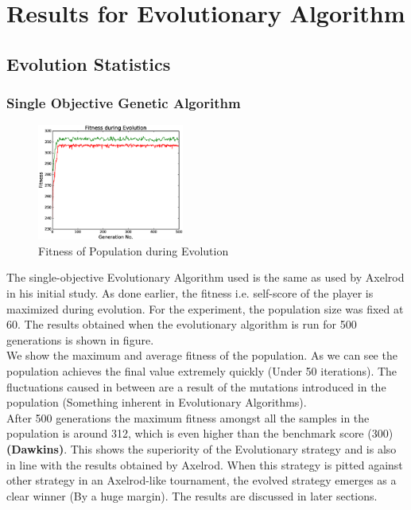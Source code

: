 \documentclass[a4paper]{article}
\begin{document}
	\section{Results for Evolutionary Algorithm}

	\subsection{Evolution Statistics}

	\subsubsection{Single Objective Genetic Algorithm}	

	\begin{figure}
	\centering
	\includegraphics[width=0.43\textwidth]{singFitPlot.eps}
	\caption{\footnotesize{Fitness of Population during Evolution}}
	\end{figure}
	The single-objective Evolutionary Algorithm used is the same as used by Axelrod in his initial study. As done earlier, the fitness i.e. self-score of the player is maximized during evolution. For the experiment, the population size was fixed at 60. The results obtained when the evolutionary algorithm is run for 500 generations is shown in figure.\\
	We show the maximum and average fitness of the population. As we can see the population achieves the final value extremely quickly (Under 50 iterations). The fluctuations caused in between are a result of the mutations introduced in the population (Something inherent in Evolutionary Algorithms).\\
	After 500 generations the maximum fitness amongst all the samples in the population is around 312, which is even higher than the benchmark score (300) \textbf{(Dawkins)}. This shows the superiority of the Evolutionary strategy and is also in line with the results obtained by Axelrod. When this strategy is pitted against other strategy in an Axelrod-like tournament, the evolved strategy emerges as a clear winner (By a huge margin). The results are discussed in later sections.	
\end{document}
